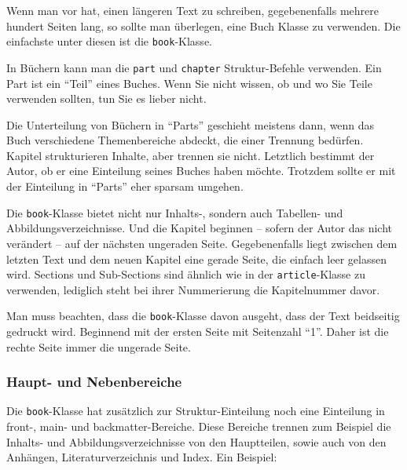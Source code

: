 Wenn man vor hat, einen längeren Text zu schreiben, gegebenenfalls mehrere hundert Seiten lang, so sollte man überlegen, eine Buch Klasse zu verwenden. Die einfachste unter diesen ist die \texttt{book}-Klasse.

In Büchern kann man die \texttt{part} und \texttt{chapter} Struktur-Befehle verwenden. Ein Part ist ein "`Teil"' eines Buches. Wenn Sie nicht wissen, ob und wo Sie Teile verwenden sollten, tun Sie es lieber nicht.

Die Unterteilung von Büchern in "`Parts"' geschieht meistens dann, wenn das Buch verschiedene Themenbereiche abdeckt, die einer Trennung bedürfen. Kapitel strukturieren Inhalte, aber trennen sie nicht. Letztlich bestimmt der Autor, ob er eine Einteilung seines Buches haben möchte. Trotzdem sollte er mit der Einteilung in "`Parts"' eher sparsam umgehen.

Die \texttt{book}-Klasse bietet nicht nur Inhalts-, sondern auch Tabellen- und Abbildungsverzeichnisse. Und die Kapitel beginnen -- sofern der Autor das nicht verändert -- auf der nächsten ungeraden Seite. Gegebenenfalls liegt zwischen dem letzten Text und dem neuen Kapitel eine gerade Seite, die einfach leer gelassen wird. Sections und Sub-Sections sind ähnlich wie in der \texttt{article}-Klasse zu verwenden, lediglich steht bei ihrer Nummerierung die Kapitelnummer davor. 

Man muss beachten, dass die \texttt{book}-Klasse davon ausgeht, dass der Text beidseitig gedruckt wird. Beginnend mit der ersten Seite mit Seitenzahl "`1"'. Daher ist die rechte Seite immer die ungerade Seite. 

\subsubsection{Haupt- und Nebenbereiche}

Die \texttt{book}-Klasse hat zusätzlich zur Struktur-Einteilung noch eine Einteilung in front-, main- und backmatter-Bereiche. Diese Bereiche trennen zum Beispiel die Inhalts- und Abbildungsverzeichnisse von den Hauptteilen, sowie auch von den Anhängen, Literaturverzeichnis und Index. Ein Beispiel:

